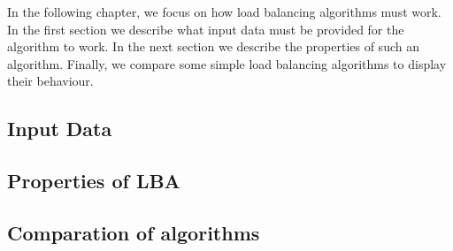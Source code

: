 In the following chapter, we focus on how load balancing algorithms must work.
In the first section we describe what input data must be provided for the
algorithm to work.
In the next section we describe the properties of such an algorithm.
Finally, we compare some simple load balancing algorithms to display their
behaviour.

\subsection{Input Data}


\subsection{Properties of \ac{LBA}}
%

\subsection{Comparation of algorithms}

